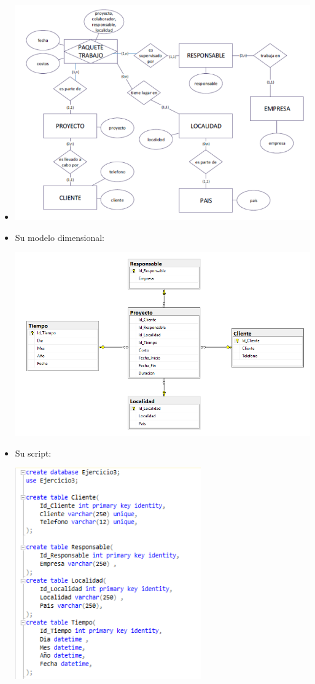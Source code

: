 \documentclass[12pt,letterpaper]{article}
\begin{document}
\begin{itemize}
\item  
	\begin{center}
	\includegraphics[width=14cm]{./Imagenes/e3}
	\end{center}
	\item Su modelo dimensional:
	\begin{center}
	\includegraphics[width=14cm]{./Imagenes/d3}
	\end{center}
\item Su script:
	\begin{center}
	\includegraphics[width=8cm]{./Imagenes/s3-1}

\end{center}
\end{itemize}
\end{document}
